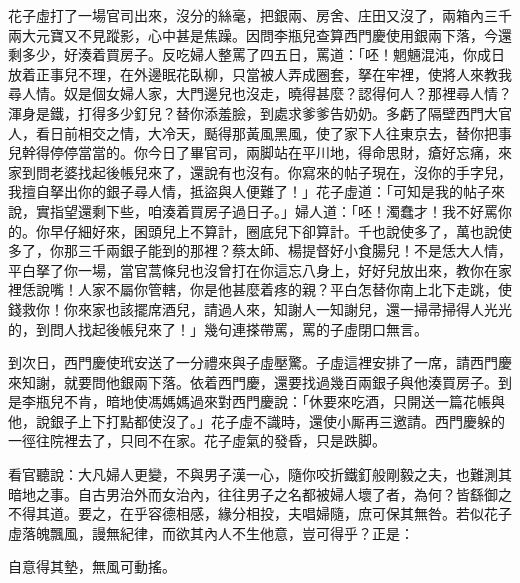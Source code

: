 花子虛打了一場官司出來，沒分的絲毫，把銀兩、房舍、庄田又沒了，兩箱內三千兩大元寶又不見蹤影，心中甚是焦躁。因問李瓶兒查算西門慶使用銀兩下落，今還剩多少，好湊着買房子。反吃婦人整罵了四五日，罵道：「呸！魍魎混沌，{}你成日放着正事兒不理，在外邊眠花臥柳，只當被人弄成圈套，拏在牢裡，使將人來教我尋人情。奴是個女婦人家，大門邊兒也沒走，曉得甚麼？認得何人？那裡尋人情？渾身是鐵，打得多少釘兒？替你添羞臉，到處求爹爹告奶奶。多虧了隔壁西門大官人，{}看日前相交之情，大冷天，颳得那黃風黑風，使了家下人往東京去，替你把事兒幹得停停當當的。你今日了畢官司，兩脚站在平川地，得命思財，瘡好忘痛，來家到問老婆找起後帳兒來了，還說有也沒有。你寫來的帖子現在，沒你的手字兒，我擅自拏出你的銀子尋人情，抵盜與人便難了！」{}{}花子虛道：「可知是我的帖子來說，{}實指望還剩下些，咱湊着買房子過日子。」婦人道：「呸！濁蠢才！我不好罵你的。你早仔細好來，囷頭兒上不算計，圈底兒下卻算計。千也說使多了，萬也說使多了，你那三千兩銀子能到的那裡？蔡太師、楊提督好小食腸兒！不是恁大人情，平白拏了你一場，當官蒿條兒也沒曾打在你這忘八身上，好好兒放出來，教你在家裡恁說嘴！人家不屬你管轄，你是他甚麼着疼的親？平白怎替你南上北下走跳，使錢救你！你來家也該擺席酒兒，請過人來，知謝人一知謝兒，還一掃帚掃得人光光的，到問人找起後帳兒來了！」幾句連搽帶罵，罵的子虛閉口無言。

到次日，西門慶使玳安送了一分禮來與子虛壓驚。子虛這裡安排了一席，請西門慶來知謝，就要問他銀兩下落。依着西門慶，還要找過幾百兩銀子與他湊買房子。到是李瓶兒不肯，{}暗地使馮媽媽過來對西門慶說：「休要來吃酒，只開送一篇花帳與他，說銀子上下打點都使沒了。」花子虛不識時，還使小厮再三邀請。西門慶躲的一徑往院裡去了，只囘不在家。花子虛氣的發昏，只是跌脚。

看官聽說：大凡婦人更變，不與男子漢一心，隨你咬折鐵釘般剛毅之夫，也難測其暗地之事。自古男治外而女治內，往往男子之名都被婦人壞了者，為何？皆繇御之不得其道。要之，在乎容德相感，緣分相投，夫唱婦隨，庶可保其無咎。若似花子虛落魄飄風，謾無紀律，而欲其內人不生他意，豈可得乎？正是：

\begin{myquote}
自意得其墊，無風可動搖。
\end{myquote}


